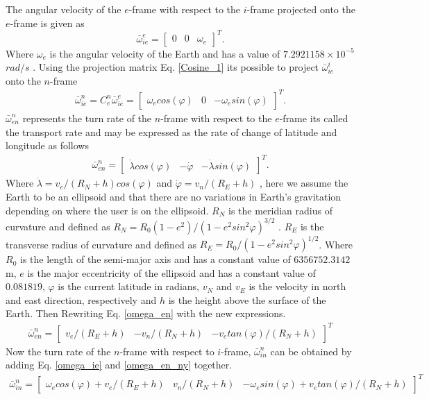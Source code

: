 The angular velocity of the $e$-frame with respect to the $i$-frame projected onto the $e$-frame is given as \cite{nonlinear}
\begin{equation}
\bar{\omega}_{ie}^e = 
\begin{bmatrix}
0 & 0 & \omega_e
\end{bmatrix}^T.
\end{equation}
Where $\omega_e$ is the angular velocity of the Earth and has a value of
$7.2921158 \times 10^{-5}$ $rad/s$ \cite{nonlinear}. Using the projection matrix Eq. \eqref{Cosine_1} its possible to project $\bar{\omega}_ {ie}^i$ onto the $n$-frame
\begin{align}
\bar{\omega}_{ie}^n=C_e^n\bar{\omega}_{ie}^e=
\begin{bmatrix}
\omega_e cos(\varphi) & 0 & -\omega_e sin(\varphi)
\end{bmatrix}^T.
\label{omega_ie}
\end{align}
$\bar{\omega}_{en}^n$ represents the turn rate of the $n$-frame with respect to the $e$-frame its called the transport rate and may be expressed as the rate of change of latitude and longitude as follows
\begin{align}
\bar{\omega}_{en}^n=
\begin{bmatrix}
\dot{\lambda}cos(\varphi) & -\dot{\varphi} & -\dot{\lambda}sin(\varphi)
\end{bmatrix}^T.
\label{omega_en}
\end{align}
Where $\dot{\lambda}=v_e/(R_N+h)cos(\varphi)$ and $\dot{\varphi}=v_n/(R_E+h)$ \cite{nonlinear}, here we assume the Earth to be an ellipsoid and that there are no variations in Earth's gravitation depending on where the user is on the ellipsoid. $R_N$ is the meridian radius of curvature and defined as $R_N=R_0(1-e^2)/(1-e^2sin^2\varphi)^{3/2}$ \cite{nonlinear}. $R_E$ is the transverse radius of curvature and defined as $R_E=R_0/(1-e^2sin^2\varphi)^{1/2}$. Where $R_0$ is the length of the semi-major axis and has a constant value of $6356752.3142$ m, $e$ is the major eccentricity of the ellipsoid and has a constant value of $0.081819$, $\varphi$ is the current latitude in radians, $v_N$ and $v_E$ is the velocity in north and east direction, respectively and $h$ is the height above the surface of the Earth. Then Rewriting Eq. \eqref{omega_en} with the new expressions.
\begin{align}
\bar{\omega}_{en}^n=
\begin{bmatrix}
v_e/(R_E+h) & -v_n/(R_N+h) & -v_e tan(\varphi)/(R_N+h)
\end{bmatrix}^T \label{omega_en_ny}
\end{align}
Now the turn rate of the $n$-frame with respect to $i$-frame, $\bar{\omega}_{in}^n$ can be obtained by adding Eq. \eqref{omega_ie} and \eqref{omega_en_ny} together.
\begin{align}
\bar{\omega}_{in}^n=
\begin{bmatrix}
\omega_e cos(\varphi) + v_e/(R_E+h) & v_n/(R_N+h) & -\omega_e sin(\varphi) + v_e tan(\varphi)/(R_N+h)
\end{bmatrix}^T
\label{Eq.omega_in}
\end{align}

